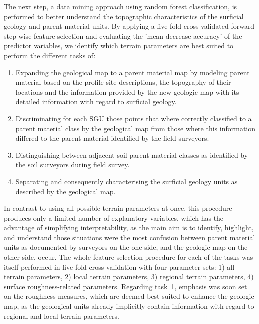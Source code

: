 \documentclass[preprint,12pt,authoryear]{elsarticle}
\begin{document}
The next step, a data mining approach using random forest classification, is performed to better understand the topographic characteristics of the surficial geology and parent material units. By applying a five-fold cross-validated forward step-wise feature selection and evaluating the 'mean decrease accuracy' of the predictor variables, we identify which terrain parameters are best suited to perform the different tasks of: 
\begin{enumerate}
\item Expanding the geological map to a parent material map by modeling parent material based on the profile site descriptions, the topography of their locations and the information provided by the new geologic map with its detailed information with regard to surficial geology.
\item Discriminating for each SGU those points that where correctly classified to a parent material class by the geological map from those where this information differed to the parent material identified by the field surveyors.
\item Distinguishing between adjacent soil parent material classes as identified by the soil surveyors during field survey.
\item Separating and consequently characterising the surficial geology units as described by the geological map.
\end{enumerate}
 In contrast to using all possible terrain parameters at once, this procedure produces only a limited number of explanatory variables, which has the advantage of simplifying interpretability, as the main aim is to identify, highlight, and understand those situations were the most confusion between parent material units as documented by surveyors on the one side, and the geologic map on the other side, occur. The whole feature selection procedure for each of the tasks was itself performed in five-fold cross-validation with four parameter sets: 1) all terrain parameters, 2) local terrain parameters, 3) regional terrain parameters, 4) surface roughness-related parameters. Regarding task~1, emphasis was soon set on the roughness measures, which are deemed best suited to enhance the geologic map, as the geological units already implicitly contain information with regard to regional and local terrain parameters. 
\end{document}
